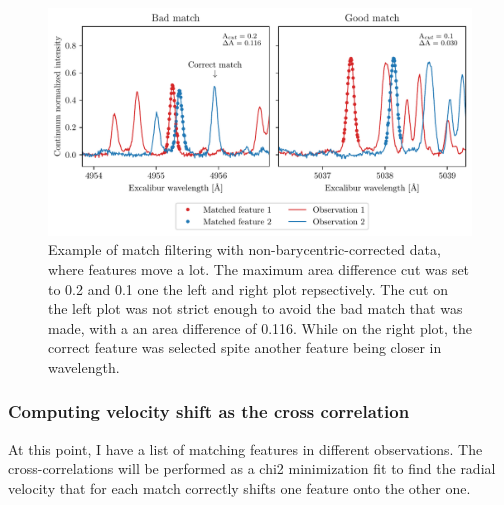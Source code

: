 
    \begin{figure}%
        \begin{wide}  
            \includegraphics[width=\textwidth]{figures/good_match_bad_match.pdf}
            \caption{Example of match filtering with non-barycentric-corrected data, where features move a lot. The maximum area difference cut was set to 0.2 and 0.1 one the left and right plot repsectively. The cut on the left plot was not strict enough to avoid the bad match that was made, with a an area difference of 0.116. While on the right plot, the correct feature was selected spite another feature being closer in wavelength.}
            \label{fig:good_match_bad_match}
        \end{wide}
    \end{figure}

    \subsubsection{Computing velocity shift as the cross correlation}

    At this point, I have a list of matching features in different observations. The cross-correlations will be performed as a chi2 minimization fit to find the radial velocity that for each match correctly shifts one feature onto the other one.
    
